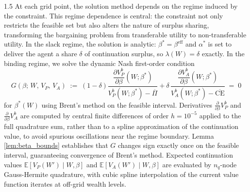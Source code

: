 \documentclass[12pt]{article}
\theoremstyle{definition}
\theoremstyle{plain}
\begin{document}
\begin{spacing}{1.5}
At each grid point, the solution method depends on the regime induced by the constraint. This regime dependence is central: the constraint not only restricts the feasible set but also alters the nature of surplus sharing, transforming the bargaining problem from transferable utility to non-transferable utility. In the slack regime, the solution is analytic: $\beta^{*} = \beta^{\mathrm{eff}}$ and $\alpha^{*}$ is set to deliver the agent a share $\delta$ of continuation surplus, so $\lambda(W) = \delta$ exactly. In the binding regime, we solve the dynamic Nash first-order condition
\begin{equation}\label{eq:foc_binding_numeric}
G(\beta;\,W,\,V_{P},\,V_{A}) \;:=\;
(1-\delta)\frac{\dfrac{\partial V_P^{b}}{\partial\beta}(W;\beta^*)}{V_P^{b}(W;\beta^*)-\overline{\Pi}}
+
\delta\,\frac{\dfrac{\partial V_A^{b}}{\partial\beta}(W;\beta^*)}{V_A^{b}(W;\beta^*)-\overline{\text{CE}}} \; = \; 0
\end{equation}
for $\beta^{*}(W)$ using Brent's method on the feasible interval. Derivatives $\tfrac{\partial}{\partial\beta} V_P^b$ and $\tfrac{\partial}{\partial\beta} V_A^b$ are computed by central finite differences of order $h = 10^{-5}$ applied to the full quadrature sum, rather than to a spline approximation of the continuation value, to avoid spurious oscillations near the regime boundary. Lemma \ref{lem:beta_bounds} establishes that $G$ changes sign exactly once on the feasible interval, guaranteeing convergence of Brent's method. Expected continuation values $\mathbb{E}[V_{P}(W') \mid W, \beta]$ and $\mathbb{E}[V_{A}(W') \mid W, \beta]$ are evaluated by $n_{q}$-node Gauss-Hermite quadrature, with cubic spline interpolation of the current value function iterates at off-grid wealth levels.
 

\end{spacing}
\end{document}
